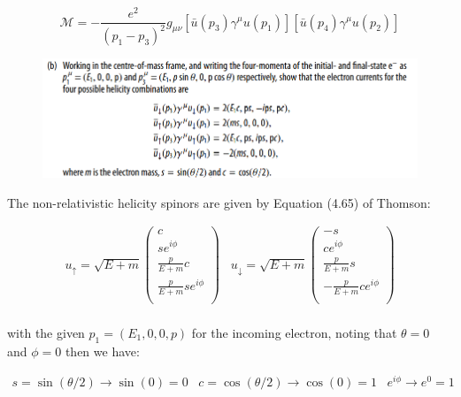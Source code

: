 \documentclass[11pt]{article}
\theoremstyle{definition}
\begin{document}
\begin{equation}
\boxed{
    \mathcal{M}
    =
    -
        \frac{e^2}{(p_1-p_3)^2}
        g_{\mu\nu}
        [\bar{u}(p_3)
        \gamma^{\mu}
        u(p_1)]
        [\bar{u}(p_4)
        \gamma^{\mu}
        u(p_2)]
}
\end{equation}
\newpage
\begin{figure}[H]
    \centering
    \includegraphics[scale = 0.5]{6.7b.png}
\end{figure}


The non-relativistic helicity spinors are given by Equation (4.65) of Thomson:

\begin{align}
    u_{\uparrow} =
    \sqrt{E+m}
    \begin{pmatrix}
        c\\
        se^{i\phi}\\
        \frac{p}{E+m}c\\
        \frac{p}{E+m}se^{i\phi}\\
    \end{pmatrix} \;\;\;
    u_{\downarrow} =
    \sqrt{E+m}
    \begin{pmatrix}
        -s\\
        ce^{i\phi}\\
        \frac{p}{E+m}s\\
        -\frac{p}{E+m}ce^{i\phi}\\
    \end{pmatrix}\\
\end{align}

with the given $p_1 = (E_1, 0, 0, p)$ for the incoming electron, noting that $\theta=0$ and $\phi=0$ then we have:

\begin{align}
    s = \sin(\theta/2) \to \sin(0) = 0 \;\;\;
    c = \cos(\theta/2) \to \cos(0) = 1\;\;\;
    e^{i\phi} \to e^{0} = 1
\end{align}
\end{document}
